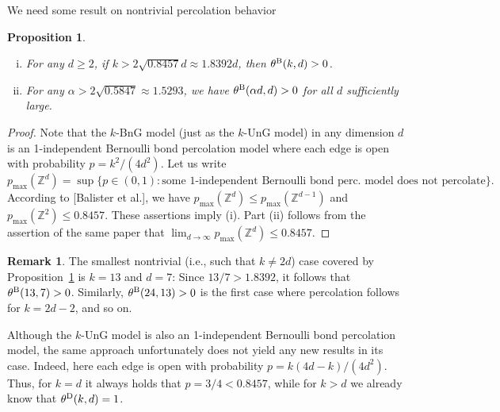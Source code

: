 \documentclass{article}
\newtheorem{prop}[theorem]{Proposition}
\theoremstyle{definition}
\newtheorem{remark}[theorem]{Remark}
\newcommand{\1}{\mathbbm{1}}
\newcommand{\0}{\mathbf{o}}
\newcommand{\Z}{\mathbb{Z}}
\begin{document}
We need some result on nontrivial percolation behavior
\begin{prop}\label{prop-1indep}
\begin{enumerate}[(i)]
\item For any $d \geq 2$, if $k>2\sqrt{0.8457}d \approx 1.8392d$, then $\theta^{\rm B}(k,d)>0$.
\item For any $\alpha > 2 \sqrt{0.5847} \approx 1.5293$, we have $\theta^{\rm B}(\alpha d, d)>0$ for all $d$ sufficiently large.
\end{enumerate}
\end{prop}
\begin{proof}
Note that the $k$-BnG model (just as the $k$-UnG model) in any dimension $d$ is an 1-independent Bernoulli bond percolation model where each edge is open with probability $p=k^2/(4d^2)$. Let us write 
\[ p_{\max}(\Z^d)= \sup \{ p \in (0,1) \colon \text{some 1-independent Bernoulli bond perc.\ model does not percolate} \}. \]
According to [Balister et al.], we have $p_{\max}(\Z^d) \leq p_{\max}(\Z^{d-1})$ and $p_{\max}(\Z^2) \leq 0.8457$. These assertions imply (i). Part (ii) follows from the assertion of the same paper that $\lim_{d\to\infty} p_{\max}(\Z^d) \leq 0.8457$. 
\end{proof}
\begin{remark}
The smallest nontrivial (i.e., such that $k \neq 2d$) case covered by Proposition~\ref{prop-1indep} is $k=13$ and $d=7$: Since $13/7 >1.8392$, it follows that $\theta^{\rm B}(13,7)>0$. Similarly, $\theta^{\rm B}(24,13)>0$ is the first case where percolation follows for $k=2d-2$, and so on.

Although the $k$-UnG model is also an 1-independent Bernoulli bond percolation model, the same approach unfortunately does not yield any new results in its case. Indeed, here each edge is open with probability $p=k(4d-k)/(4d^2)$. Thus, for $k=d$ it always holds that $p=3/4<0.8457$, while for $k>d$ we already know that $\theta^{\rm D}(k,d)=1$. 
\end{remark}

\end{document}
